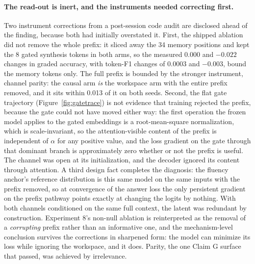 \documentclass[10pt,a4paper]{article}
\begin{document}
\paragraph{The read-out is inert, and the instruments needed correcting first.}
Two instrument corrections from a post-session code audit are disclosed ahead
of the finding, because both had initially overstated it. First, the shipped
ablation did not remove the whole prefix: it sliced away the 34 memory
positions and kept the 8 gated synthesis tokens in both arms, so the measured
0.000 and $-0.022$ changes in graded accuracy, with token-F1 changes of
0.0003 and $-0.003$, bound the memory tokens only. The full prefix is bounded
by the stronger instrument, channel parity: the causal arm \emph{is} the
workspace arm with the entire prefix removed, and it sits within 0.013 of it
on both seeds. Second, the flat gate trajectory
(Figure~\ref{fig:gatetrace}) is not evidence that training rejected the
prefix, because the gate could not have moved either way: the first operation
the frozen model applies to the gated embeddings is a root-mean-square
normalization, which is scale-invariant, so the attention-visible content of
the prefix is independent of $\alpha$ for any positive value, and the loss
gradient on the gate through that dominant branch is approximately zero
whether or not the prefix is useful. The channel was open at its
initialization, and the decoder ignored its content through attention. A
third design fact completes the diagnosis: the fluency anchor's reference
distribution is this same model on the same inputs with the prefix removed,
so at convergence of the answer loss the only persistent gradient on the
prefix pathway points exactly at changing the logits by nothing. With both
channels conditioned on the same full context, the latent was redundant by
construction. Experiment 8's non-null ablation is reinterpreted as the removal of
a \emph{corrupting} prefix rather than an informative one, and the
mechanism-level conclusion survives the corrections in sharpened form: the
model can minimize its loss while ignoring the workspace, and it does.
Parity, the one Claim G surface that passed, was achieved by irrelevance.
\end{document}
